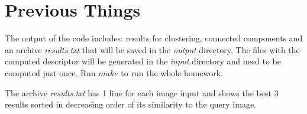 \section{Previous Things}

The output of the code includes: results for clustering, connected components and an archive \textit{results.txt} that will be saved in the \textit{output} directory. The files with the computed descriptor will be generated in the \textit{input} directory and need to be computed just once. Run $make$ to run the whole homework.

The archive \textit{results.txt} has 1 line for each image input and shows the best 3 results sorted in decreasing order of its similarity to the query image.

